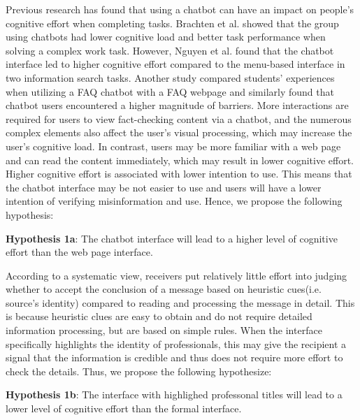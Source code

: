 Previous research has found that using a chatbot can have an impact on people's cognitive effort when completing tasks. 
Brachten et al.\cite[]{brachten2020ability} showed that the group using chatbots had lower cognitive load and better task performance when solving a complex work task. 
However, Nguyen et al.\cite[]{nguyen2022user} found that the chatbot interface led to higher cognitive effort compared to the menu-based interface in two information search tasks. 
Another study compared students' experiences when utilizing a FAQ chatbot with a FAQ webpage and similarly found that chatbot users encountered a higher magnitude of barriers\cite[]{han2022faq}.
More interactions are required for users to view fact-checking content via a chatbot, and the numerous complex elements also affect the user's visual processing\cite[]{harper2009toward}, which may increase the user's cognitive load. 
In contrast, users may be more familiar with a web page and can read the content immediately, which may result in lower cognitive effort.
Higher cognitive effort is associated with lower intention to use\cite[]{venkatesh2003user}. 
This means that the chatbot interface may be not easier to use and users will have a lower intention of verifying misinformation and use.
Hence, we propose the following hypothesis:

\textbf{Hypothesis 1a}:
The chatbot interface will lead to a higher level of cognitive effort than the web page interface.

According to a systematic view, receivers put relatively little effort into judging whether to accept the conclusion of a message based on heuristic cues(i.e. source's identity) compared to reading and processing the message in detail.
This is because heuristic clues are easy to obtain and do not require detailed information processing, but are based on simple rules.
When the interface specifically highlights the identity of professionals, this may give the recipient a signal that the information is credible and thus does not require more effort to check the details.
Thus, we propose the following hypothesize:

\textbf{Hypothesis 1b}:
The interface with highlighed professonal titles will lead to a lower level of cognitive effort than the formal interface.

